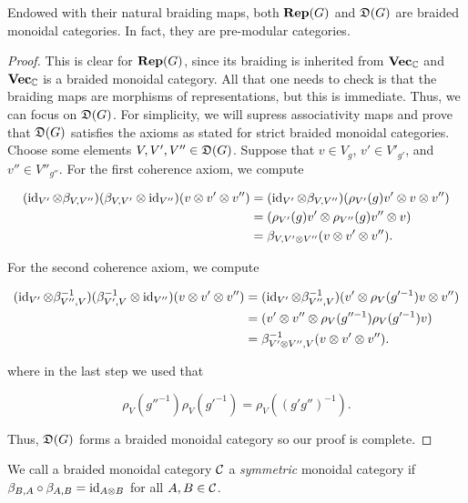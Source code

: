\begin{prop}\label{braiding-structures-are-good} Endowed with their natural braiding maps, both ${\bf Rep}(G)$ and ${\mathfrak D}(G)$ are braided monoidal categories. In fact, they are pre-modular categories.
\end{prop} 
\begin{proof}This is clear for ${\bf Rep}(G)$, since its braiding is inherited from ${\bf Vec}_{{\mathbb C}}$ and ${\bf Vec}_{{\mathbb C}}$ is a braided monoidal category. All that one needs to check is that the braiding maps are morphisms of representations, but this is immediate. Thus, we can focus on ${\mathfrak D}(G)$. For simplicity, we will supress associativity maps and prove that ${\mathfrak D}(G)$ satisfies the axioms as stated for strict braided monoidal categories. Choose some elements $V,V',V''\in {\mathfrak D}(G)$. Suppose that $v\in V_g$, $v'\in V'_{g'}$, and $v''\in V''_{g''}$. For the first coherence axiom, we compute

\begin{align*}
(\operatorname{id}_{V'}\otimes \beta_{V,V''})(\beta_{V,V'}\otimes \operatorname{id}_{V''})(v\otimes v'\otimes v'')&=(\operatorname{id}_{V'}\otimes \beta_{V,V''})(\rho_{V'}(g)v'\otimes v\otimes v'')\\
&=(\rho_{V'}(g)v'\otimes \rho_{V''}(g)v''\otimes v)\\
&=\beta_{V,V'\otimes V''}(v\otimes v'\otimes v'').
\end{align*}

For the second coherence axiom, we compute

\begin{align*}
(\operatorname{id}_{V'}\otimes \beta^{-1}_{V'',V})(\beta^{-1}_{V',V}\otimes \operatorname{id}_{V''})(v\otimes v'\otimes v'')&=(\operatorname{id}_{V'}\otimes \beta^{-1}_{V'',V})(v'\otimes \rho_{V}(g'^{-1})v\otimes v'')\\
&=(v'\otimes v''\otimes \rho_{V}(g''^{-1})\rho_{V}(g'^{-1})v)\\
&=\beta_{V'\otimes V'',V}^{-1}(v\otimes v'\otimes v'').
\end{align*}

where in the last step we used that

$$\rho_{V}(g''^{-1})\rho_{V}(g'^{-1})=\rho_V((g'g'')^{-1}).$$

Thus, ${\mathfrak D}(G)$ forms a braided monoidal category so our proof is complete.
\end{proof}

\begin{defn} We call a braided monoidal category ${\mathcal C}$ a {\em symmetric} monoidal category if $\beta_{B,A}\circ \beta_{A,B}=\operatorname{id}_{A\otimes B}$ for all $A,B\in {\mathcal C}$.
\end{defn}

